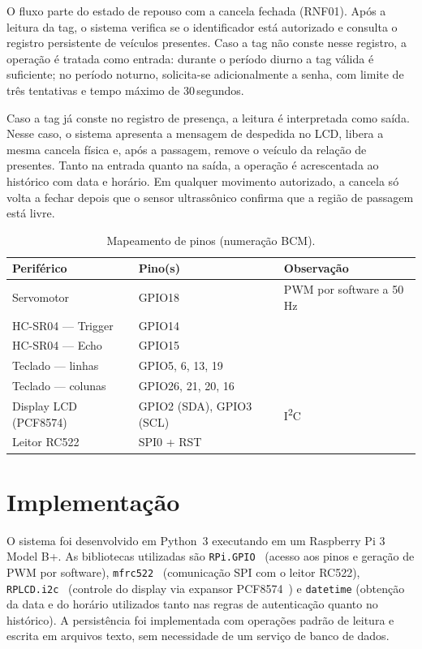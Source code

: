 \documentclass[11pt,a4paper]{article}
\begin{document}
O fluxo parte do estado de repouso com a cancela fechada (RNF01). Após a
leitura da tag, o sistema verifica se o identificador está autorizado e consulta
o registro persistente de veículos presentes. Caso a tag não conste nesse
registro, a operação é tratada como entrada: durante o período diurno a tag
válida é suficiente; no período noturno, solicita-se adicionalmente a senha,
com limite de três tentativas e tempo máximo de 30\,segundos.

Caso a tag já conste no registro de presença, a leitura é interpretada como
saída. Nesse caso, o sistema apresenta a mensagem de despedida no LCD, libera a
mesma cancela física e, após a passagem, remove o veículo da relação de
presentes. Tanto na entrada quanto na saída, a operação é acrescentada ao
histórico com data e horário. Em qualquer movimento autorizado, a cancela só
volta a fechar depois que o sensor ultrassônico confirma que a região de
passagem está livre.

\begin{table}[H]
\centering
\small
\caption{Mapeamento de pinos (numeração BCM).}
\label{tab:pinos}
\begin{tabular}{@{}llL{6.2cm}@{}}
\toprule
\textbf{Periférico} & \textbf{Pino(s)} & \textbf{Observação} \\
\midrule
Servomotor            & GPIO18              & PWM por software a 50\,Hz \\
HC-SR04 --- Trigger   & GPIO14              &  \\
HC-SR04 --- Echo      & GPIO15              &  \\
Teclado --- linhas    & GPIO5, 6, 13, 19    &  \\
Teclado --- colunas   & GPIO26, 21, 20, 16  &  \\
Display LCD (PCF8574) & GPIO2 (SDA), GPIO3 (SCL) & I\textsuperscript{2}C \\
Leitor RC522          & SPI0 + RST          &  \\
\bottomrule
\end{tabular}
\end{table}


\section{Implementação}

O sistema foi desenvolvido em Python~3 executando em um Raspberry Pi 3 Model B+.
As bibliotecas utilizadas são \texttt{RPi.GPIO}~\cite{rpigpio} (acesso aos pinos
e geração de PWM por software), \texttt{mfrc522}~\cite{mfrc522lib} (comunicação
SPI com o leitor RC522), \texttt{RPLCD.i2c}~\cite{rplcd} (controle do display via
expansor PCF8574~\cite{pcf8574ds}) e \texttt{datetime} (obtenção da data e do
horário utilizados tanto nas regras de autenticação quanto no histórico). A
persistência foi implementada com operações padrão de leitura e escrita em
arquivos texto, sem necessidade de um serviço de banco de dados.
\end{document}
